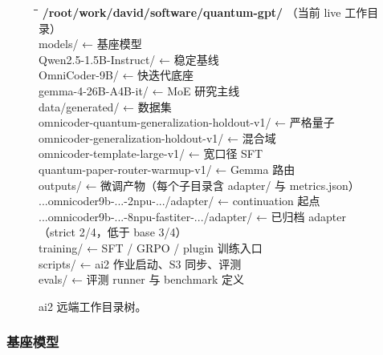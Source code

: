 \documentclass[11pt,a4paper]{article}
\begin{document}
\begin{figure}[htbp]
\centering
\begin{minipage}{0.92\textwidth}
\ttfamily\small
\begin{tabbing}
\hspace{0.5cm}\=\hspace{0.5cm}\=\hspace{0.5cm}\=\kill
\textbf{/root/work/david/software/quantum-gpt/} \normalfont\scriptsize （当前 live 工作目录）\\
\>models/ \normalfont\scriptsize ← 基座模型\\
\>\>\ttfamily Qwen2.5-1.5B-Instruct/ \normalfont\scriptsize ← 稳定基线\\
\>\>\ttfamily OmniCoder-9B/ \normalfont\scriptsize ← 快迭代底座\\
\>\>\ttfamily gemma-4-26B-A4B-it/ \normalfont\scriptsize ← MoE 研究主线\\[2pt]
\>data/generated/ \normalfont\scriptsize ← 数据集\\
\>\>\ttfamily omnicoder-quantum-generalization-holdout-v1/ \normalfont\scriptsize ← 严格量子\\
\>\>\ttfamily omnicoder-generalization-holdout-v1/ \normalfont\scriptsize ← 混合域\\
\>\>\ttfamily omnicoder-template-large-v1/ \normalfont\scriptsize ← 宽口径 SFT\\
\>\>\ttfamily quantum-paper-router-warmup-v1/ \normalfont\scriptsize ← Gemma 路由\\[2pt]
\>outputs/ \normalfont\scriptsize ← 微调产物（每个子目录含 adapter/ 与 metrics.json）\\
\>\>\ttfamily ...omnicoder9b-...-2npu-.../adapter/ \normalfont\scriptsize ← continuation 起点\\
\>\>\ttfamily ...omnicoder9b-...-8npu-fastiter-.../adapter/ \normalfont\scriptsize ← 已归档 adapter（strict 2/4，低于 base 3/4）\\[2pt]
\>training/ \normalfont\scriptsize ← SFT / GRPO / plugin 训练入口\\
\>scripts/ \normalfont\scriptsize ← ai2 作业启动、S3 同步、评测\\
\>evals/ \normalfont\scriptsize ← 评测 runner 与 benchmark 定义
\end{tabbing}
\end{minipage}
\caption{ai2 远端工作目录树。}
\label{fig:ai2-directory-tree}
\end{figure}

\subsubsection{基座模型}
\end{document}
